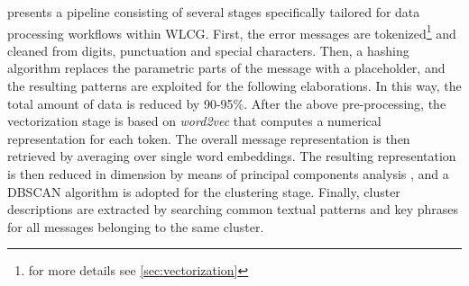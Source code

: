  presents a pipeline consisting of several stages specifically tailored for data processing workflows within WLCG. 
First, the error messages are tokenized\footnote{\label{note1}for more details see \cref{sec:vectorization}} and cleaned from digits, punctuation and special characters.
Then, a hashing algorithm replaces the parametric parts of the message with a placeholder, and the resulting patterns are exploited for the following elaborations. In this way, the total amount of data is reduced by 90-95\%.
After the above pre-processing, the vectorization stage is based on \textit{word2vec} \cite{mikolov2013word2vec} that computes a numerical representation for each token. The overall message representation is then retrieved by averaging over single word embeddings.
The resulting representation is then reduced in dimension by means of principal components analysis \cite{wold1987pca}, and a DBSCAN \cite{ester1996dbscan} algorithm is adopted for the clustering stage.
Finally, cluster descriptions are extracted by searching common textual patterns and key phrases for all messages belonging to the same cluster.


